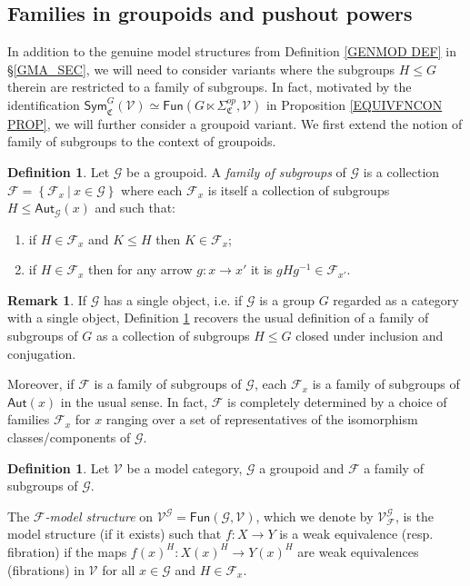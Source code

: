 \documentclass[a4paper,10pt
,draft
]{article}%
\numberwithin{equation}{section}
\numberwithin{figure}{section}
\theoremstyle{definition} %
\newtheorem{definition}[equation]{Definition}%
\newtheorem{remark}[equation]{Remark}%
\newcommand{\Fun}{\mathsf{Fun}}
\newcommand{\F}{\ensuremath{\mathcal F}}
\newcommand{\V}{\ensuremath{\mathcal V}}
\newcommand{\G}{\ensuremath{\mathcal G}}
\newcommand{\1}{\ensuremath{\mathbbm 1}}%
\begin{document}
\subsection{Families in groupoids and pushout powers}
\label{FGPP_SEC}


In addition to the genuine model structures
from Definition \ref{GENMOD DEF} in \S \ref{GMA_SEC},
we will need to consider variants
where the subgroups $H\leq G$ therein are restricted to a family of subgroups.
In fact, motivated by the identification
$\mathsf{Sym}^G_{\mathfrak{C}}(\V) \simeq 
\mathsf{Fun}(G \ltimes \Sigma^{op}_{\mathfrak{C}},\V)$
in Proposition \ref{EQUIVFNCON PROP},
we will further consider a groupoid variant.
We first extend the notion of family of subgroups to the context of groupoids.


\begin{definition}\label{FAMGROUPOID DEF}
	Let $\G$ be a groupoid.
	A \textit{family of subgroups} of $\G$
	is a collection 
	$\mathcal{F} = \left\{\mathcal{F}_x\ | \ x\in \G\right\}$
	where each $\F_x$ is itself a collection of subgroups
	$H \leq \mathsf{Aut}_{\mathcal{G}}(x)$ and such that:
	\begin{enumerate}[label = (\roman*)]
		\item if $H \in \F_x$ and $K \leq H$ then $K \in \mathcal{F}_x$;
		\item if $H \in \mathcal{F}_x$
		then for any arrow $g \colon x \to x'$
		it is $g H g^{-1} \in \mathcal{F}_{x'}$.
	\end{enumerate}
\end{definition}


\begin{remark}
	If $\G$ has a single object, i.e. if $\G$ is a group $G$ regarded as a category with a single object, Definition \ref{FAMGROUPOID DEF} recovers the usual definition of a family of subgroups of $G$ as a collection of subgroups $H\leq G$ closed under inclusion and conjugation.
	
	Moreover, if $\F$ is a family of subgroups of $\G$, each $\F_x$ is a family of subgroups of $\mathsf{Aut}(x)$ in the usual sense. 
	In fact, $\mathcal{F}$ is completely determined by a choice of families
	$\F_x$ for $x$ ranging over a set of representatives of the isomorphism classes/components of $\G$.
\end{remark}



\begin{definition}
	Let $\V$ be a model category, $\G$ a groupoid and 
	$\F$ a family of subgroups of $\G$.
	
	The \textit{$\F$-model structure} on $\V^\G = \Fun(\G, \V)$, 
	which we denote by $\V^\G_\F$,
	is the model structure (if it exists)
	such that 
	$f\colon X \to Y$
	is a weak equivalence (resp. fibration)
	if the maps $f(x)^H \colon X(x)^H \to Y(x)^H$ are weak equivalences (fibrations) in $\V$ for all $x \in \G$ and $H \in \F_x$.
\end{definition}
\end{document}
